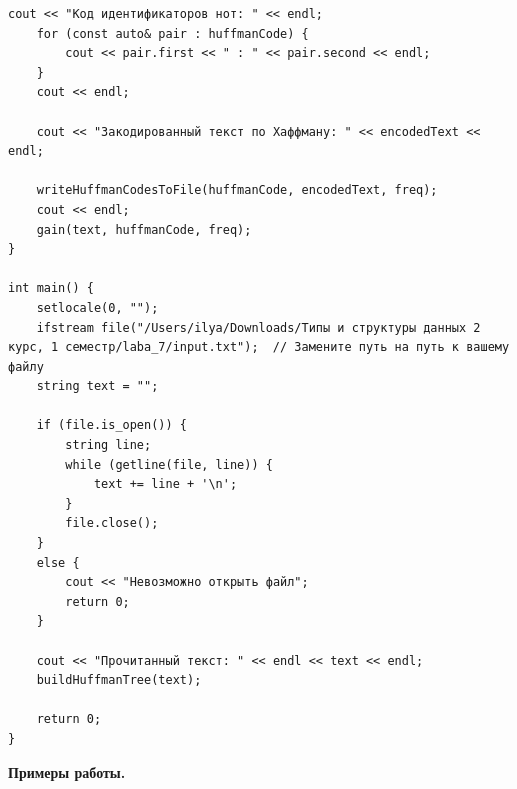 \documentclass[12pt, a4paper]{article}
\begin{document}
\begin{lstlisting}[caption={Исходный код}, label={lst:label1}]
    cout << "Код идентификаторов нот: " << endl;
    for (const auto& pair : huffmanCode) {
        cout << pair.first << " : " << pair.second << endl;
    }
    cout << endl;

    cout << "Закодированный текст по Хаффману: " << encodedText << endl;

    writeHuffmanCodesToFile(huffmanCode, encodedText, freq);
    cout << endl;
    gain(text, huffmanCode, freq);
}

int main() {
    setlocale(0, "");
    ifstream file("/Users/ilya/Downloads/Типы и структуры данных 2 курс, 1 семестр/laba_7/input.txt");  // Замените путь на путь к вашему файлу
    string text = "";

    if (file.is_open()) {
        string line;
        while (getline(file, line)) {
            text += line + '\n';
        }
        file.close();
    }
    else {
        cout << "Невозможно открыть файл";
        return 0;
    }

    cout << "Прочитанный текст: " << endl << text << endl;
    buildHuffmanTree(text);

    return 0;
}
\end{lstlisting}
\newpage
\textbf{Примеры работы.}
\end{document}
